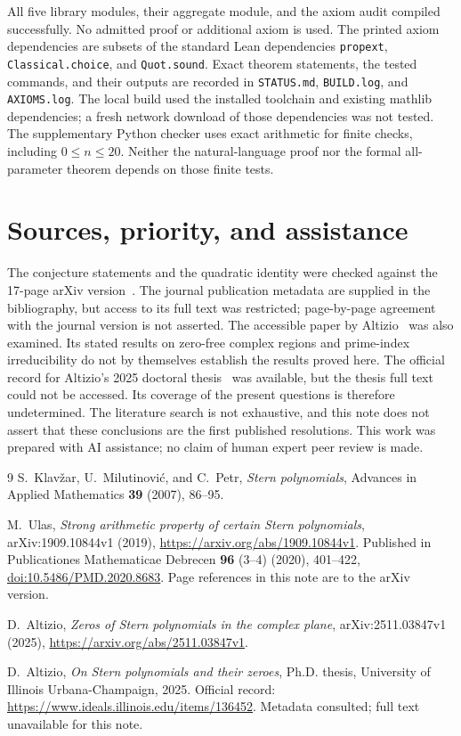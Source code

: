 \documentclass[11pt]{article}
\theoremstyle{remark}
\begin{document}
All five library modules, their aggregate module, and the axiom audit
compiled successfully. No admitted proof or additional axiom is used.
The printed axiom dependencies are subsets of the standard Lean
dependencies \texttt{propext}, \texttt{Classical.choice}, and
\texttt{Quot.sound}. Exact theorem statements, the tested commands,
and their outputs are recorded in \texttt{STATUS.md}, \texttt{BUILD.log},
and \texttt{AXIOMS.log}. The local build used the installed toolchain
and existing mathlib dependencies; a fresh network download of those
dependencies was not tested.
The supplementary Python checker uses exact arithmetic for finite
checks, including $0\leq n\leq20$. Neither the natural-language proof
nor the formal all-parameter theorem depends on those finite tests.

\section{Sources, priority, and assistance}
The conjecture statements and the quadratic identity were checked against
the 17-page arXiv version~\cite{Ulas}. The journal publication metadata
are supplied in the bibliography, but access to its full text was
restricted; page-by-page agreement with the journal version is not
asserted. The accessible paper by Altizio~\cite{AltizioPaper} was also
examined. Its stated results on zero-free complex regions and
prime-index irreducibility do not by themselves establish the results
proved here. The official record for Altizio's 2025 doctoral
thesis~\cite{AltizioThesis} was available, but the thesis full text
could not be accessed. Its coverage of the present questions is
therefore undetermined. The literature search is not exhaustive, and
this note does not assert that these conclusions are the first published
resolutions. This work was prepared with AI assistance; no claim of
human expert peer review is made.

\begin{thebibliography}{9}
S.~Klav\v{z}ar, U.~Milutinovi\'{c}, and C.~Petr,
\emph{Stern polynomials}, Advances in Applied Mathematics
\textbf{39} (2007), 86--95.

M.~Ulas, \emph{Strong arithmetic property of certain Stern polynomials},
arXiv:1909.10844v1 (2019),
\url{https://arxiv.org/abs/1909.10844v1}.
Published in Publicationes Mathematicae Debrecen
\textbf{96} (3--4) (2020), 401--422,
\href{https://doi.org/10.5486/PMD.2020.8683}{doi:10.5486/PMD.2020.8683}.
Page references in this note are to the arXiv version.

D.~Altizio, \emph{Zeros of Stern polynomials in the complex plane},
arXiv:2511.03847v1 (2025),
\url{https://arxiv.org/abs/2511.03847v1}.

D.~Altizio, \emph{On Stern polynomials and their zeroes},
Ph.D. thesis, University of Illinois Urbana-Champaign, 2025.
Official record: \url{https://www.ideals.illinois.edu/items/136452}.
Metadata consulted; full text unavailable for this note.
\end{thebibliography}
\end{document}
